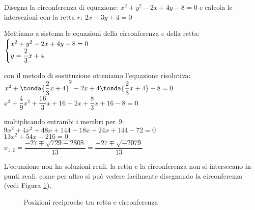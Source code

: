 \begin{esempio}
Disegna la circonferenza di equazione: \(x^2 +y^2 -2x +4y -8 = 0\) e
calcola le intersezioni con la retta \(r:~2x -3y +4 = 0\)

Mettiamo a sistema le equazioni della circonferenza e della retta: \\
\(\begin{cases}x^2 +y^2 -2x +4y -8 = 0 \\ y = \dfrac{2}{3}x +4\end{cases}\) 

con il metodo di sostituzione otteniamo l'equazione risolutiva: \\
\(x^2 +\tonda{\dfrac{2}{3}x +4}^2 -2x +4\tonda{\dfrac{2}{3}x +4} -8 = 0\) \\
\(x^2 +\dfrac{4}{9}x^2 + \dfrac{16}{3}x +16 -2x +\dfrac{8}{3}x +16 -8 = 0\) 

moltiplicando entrambi i membri per~9: \\
\(9x^2 +4x^2 + 48x +144 -18x +24x +144 -72 = 0\) \\
\(13x^2 + 54x +216 = 0\) \\
\(x_{1,2} = \dfrac{-27 \mp \sqrt{729 -2808}}{13} = 
            \dfrac{-27 \mp \sqrt{-2079}}{13}\) 
            
L'equazione non ha soluzioni reali, la retta e la circonferenza non si 
intersecano in punti reali. come per altro si può vedere facilmente disegnando 
la circonferenza (vedi Figura \ref{fig:circ_circrette}).
\end{esempio}

\begin{figure}
\begin{center}
\begin{inaccessibleblock}
  \circrette
  \caption{Posizioni reciproche tra retta e circonferenza}
  \label{fig:circ_circrette}
\end{inaccessibleblock}
\end{center}
\end{figure}

